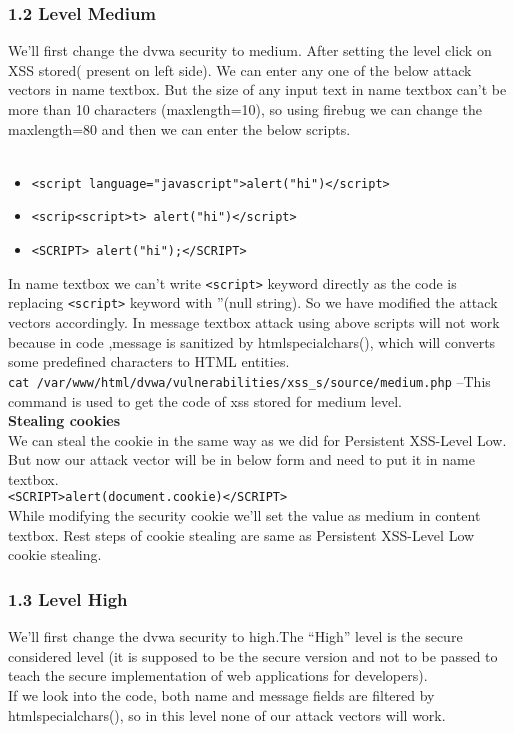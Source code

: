 \documentclass{article}
\begin{document}
\subsubsection*{1.2 Level Medium}
We'll first change the dvwa security to medium. After setting the level click on XSS stored( present on left side). We can enter any one of the  below attack vectors in name textbox. But the size of any input text in name textbox can't be more than 10 characters (maxlength=10), so using firebug we can change the maxlength=80 and then we can enter the below scripts.\\
\\  \begin{itemize}
     \item {\tt <script language="javascript">alert("hi")</script>}
     \item {\tt <scrip<script>t> alert("hi")</script>}
     \item {\tt <SCRIPT> alert("hi");</SCRIPT>}
    \end{itemize}

In name textbox we can't write {\tt <script>} keyword directly as the code is replacing {\tt <script>} keyword with ''(null string). So we have modified the attack vectors accordingly.
In message textbox attack using above scripts will not work because in code ,message is sanitized by htmlspecialchars(), which will converts some predefined characters to HTML entities.\\
{\tt cat /var/www/html/dvwa/vulnerabilities/xss\_s/source/medium.php} --This command is used to get the code of xss stored for medium level.\\

\noindent \textbf{Stealing cookies}\\
We can steal the cookie in the same way as we did for Persistent XSS-Level Low. But now our attack vector will be in below form and need to put it in name textbox.\\
{\tt <SCRIPT>alert(document.cookie)</SCRIPT>}\\
While modifying  the security cookie we'll set the value as medium in content textbox. Rest steps of cookie stealing are same as Persistent XSS-Level Low cookie stealing.
\subsubsection*{1.3 Level High}
We'll first change the dvwa security to high.The “High” level is the secure considered level (it is supposed to be the secure version and not to be passed to teach the secure implementation of web applications for developers).\\
If we look into the code, both name and message fields are filtered by htmlspecialchars(), so in this level none of our attack vectors will work.
\end{document}
